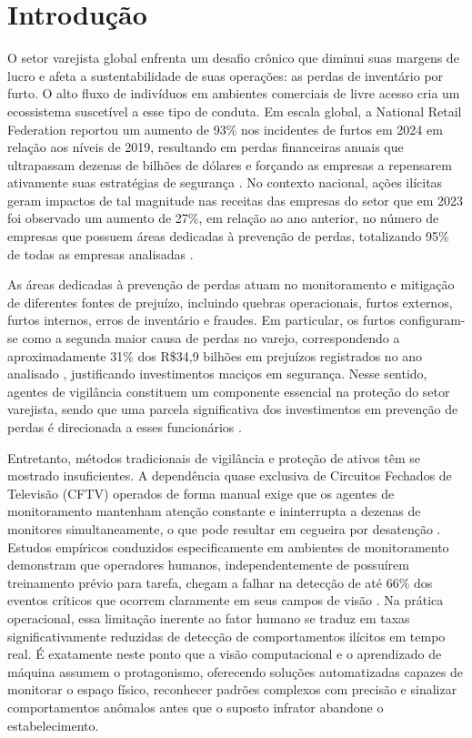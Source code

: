 \documentclass[12pt, %
openright, 
oneside, %
a4paper,    %
brazil]{facom-ufu-abntex2}
\begin{document}

\chapter[Introdução]{Introdução}
\label{chap:introducao}
O setor varejista global enfrenta um desafio crônico que diminui suas margens de lucro e afeta a sustentabilidade de suas operações: as perdas de inventário por furto. O alto fluxo de indivíduos em ambientes comerciais de livre acesso cria um ecossistema suscetível a esse tipo de conduta. Em escala global, a National Retail Federation reportou um aumento de 93\% nos incidentes de furtos em 2024 em relação aos níveis de 2019, resultando em perdas financeiras anuais que ultrapassam dezenas de bilhões de dólares e forçando as empresas a repensarem ativamente suas estratégias de segurança \cite{nrf}. No contexto nacional, ações ilícitas geram impactos de tal magnitude nas receitas das empresas do setor que em 2023 foi observado um aumento de 27\%, em relação ao ano anterior, no número de empresas que possuem áreas dedicadas à prevenção de perdas, totalizando 95\% de todas as empresas analisadas \cite{abrappe2024}.

As áreas dedicadas à prevenção de perdas atuam no monitoramento e mitigação de diferentes fontes de prejuízo, incluindo quebras operacionais, furtos externos, furtos internos, erros de inventário e fraudes. Em particular, os furtos configuram-se como a segunda maior causa de perdas no varejo, correspondendo a aproximadamente 31\% dos R\$34,9 bilhões em prejuízos registrados no ano analisado \cite{abrappe2024}, justificando investimentos maciços em segurança. Nesse sentido, agentes de vigilância constituem um componente essencial na proteção do setor varejista, sendo que uma parcela significativa dos investimentos em prevenção de perdas é direcionada a esses funcionários \cite{efforts}.

Entretanto, métodos tradicionais de vigilância e proteção de ativos têm se mostrado insuficientes. A dependência quase exclusiva de Circuitos Fechados de Televisão (CFTV) operados de forma manual exige que os agentes de monitoramento mantenham atenção constante e ininterrupta a dezenas de monitores simultaneamente, o que pode resultar em cegueira por desatenção \cite{gorila}. Estudos empíricos conduzidos especificamente em ambientes de monitoramento demonstram que operadores humanos, independentemente de possuírem treinamento prévio para tarefa, chegam a falhar na detecção de até 66\% dos eventos críticos que ocorrem claramente em seus campos de visão \cite{blind}. Na prática operacional, essa limitação inerente ao fator humano se traduz em taxas significativamente reduzidas de detecção de comportamentos ilícitos em tempo real. É exatamente neste ponto que a visão computacional e o aprendizado de máquina assumem o protagonismo, oferecendo soluções automatizadas capazes de monitorar o espaço físico, reconhecer padrões complexos com precisão e sinalizar comportamentos anômalos antes que o suposto infrator abandone o estabelecimento.
\end{document}
